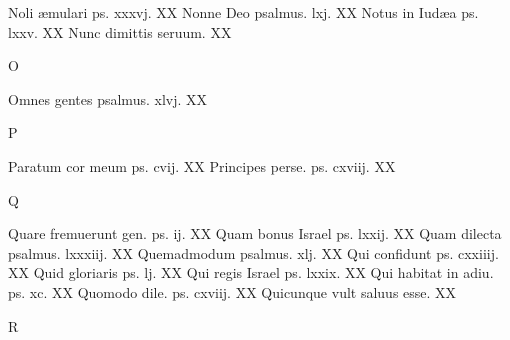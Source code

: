 \documentclass[a5paper,10pt]{book}
\def\ae{æ}
\begin{document}
\begin{multicols}{2}
\newline Noli \ae mulari ps. xxxvj. \hfill XX
\newline Nonne Deo psalmus. lxj. \hfill XX
\newline Notus in Iud\ae a ps. lxxv. \hfill XX
\newline Nunc dimittis seruum. \hfill XX
\newline \vspace{-1.75em}
\begin{center}
\color{red} O
\end{center}
\vspace{-.75em}
\par \noindent Omnes gentes psalmus. xlvj. \hfill XX
\newline \vspace{-1.75em}
\begin{center}
\color{red} P
\end{center}
\vspace{-.75em}
\par \noindent Paratum cor meum ps. cvij. \hfill XX
\newline Principes perse. ps. cxviij. \hfill XX
\newline \vspace{-1.75em}
\begin{center}
\color{red} Q
\end{center}
\vspace{-.75em}
\par \noindent Quare fremuerunt gen. ps. ij. \hfill XX
\newline Quam bonus Israel ps. lxxij. \hfill XX
\newline Quam dilecta psalmus. lxxxiij. \hfill XX
\newline Quemadmodum psalmus. xlj. \hfill XX
\newline Qui confidunt ps. cxxiiij. \hfill XX
\newline Quid gloriaris ps. lj. \hfill XX
\newline Qui regis Israel ps. lxxix. \hfill XX
\newline Qui habitat in adiu. ps. xc. \hfill XX
\newline Quomodo dile. ps. cxviij. \hfill XX
\newline Quicunque vult saluus esse. \hfill XX
\newline \vspace{-1.75em}
\begin{center}
\color{red} R
\end{center}
\vspace{-.75em}

\end{multicols}
\end{document}
